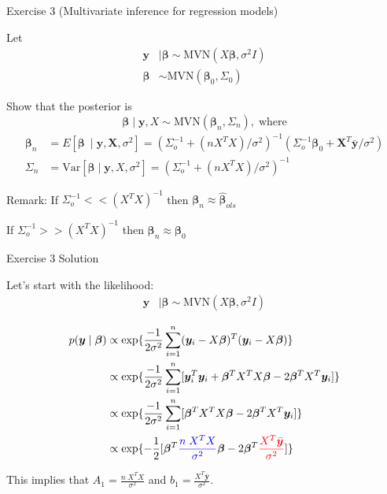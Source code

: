 \documentclass[
  ignorenonframetext,
]{beamer}
\newcommand{\bbeta}{\bm{\beta}}
\newcommand{\bX}   {\bm{X}}
\begin{document}
\begin{frame}{Exercise 3 (Multivariate inference for regression models)}
\protect\hypertarget{exercise-3-multivariate-inference-for-regression-models}{}

Let \begin{align}
\bm{y} &\mid \bbeta \sim \text{MVN}(X \bbeta, \sigma^2 I)\\
\bbeta &\sim \text{MVN}(\bbeta_0, \Sigma_0)
\end{align}

Show that the posterior is
\[\bbeta \mid \bm{y}, X \sim \text{MVN}(\bbeta_n, \Sigma_n), \; \text{where}\]
\begin{align*}
\bbeta_n &= E[\bbeta\ \mid \bm{y}, \bX, \sigma^2] = (\Sigma_o^{-1} + (nX^TX)/\sigma^2)^{-1}
(\Sigma_o^{-1}\bbeta_0 + \bX^T\bm{\bar{y}}/\sigma^2) \\
\Sigma_n &= \text{Var}[\bbeta \mid \bm{y}, X, \sigma^2] = (\Sigma_o^{-1} + (nX^TX)/\sigma^2)^{-1}
\end{align*}

Remark: If \(\Sigma_o^{-1} << (X^TX)^{-1}\) then
\(\bbeta_n \approx \hat{\bbeta}_{ols}\)

If \(\Sigma_o^{-1} >> (X^TX)^{-1}\) then \(\bbeta_n \approx \bbeta_{0}\)

\end{frame}

\begin{frame}{Exercise 3 Solution}
\protect\hypertarget{exercise-3-solution}{}

Let's start with the likelihood: \begin{align}
\bm{y} &\mid \bbeta \sim \text{MVN}(X \bbeta, \sigma^2 I)
\end{align}

\begin{align}
p(\bm{y}  \mid  \bbeta) &\propto \exp\{\frac{-1}{2\sigma^2}
\sum_{i=1}^n
(\bm{y}_i - X\bbeta)^T(\bm{y}_i - X\bbeta)
\} \\
&\propto \exp\{\frac{-1}{2\sigma^2}
\sum_{i=1}^n
[
\bm{y}_i^T\bm{y}_i + \bbeta^TX^TX\bbeta - 2\bbeta^TX^T\bm{y}_i
]
\}\\
&\propto \exp\{\frac{-1}{2\sigma^2}
\sum_{i=1}^n
[
\bbeta^TX^TX\bbeta - 2\bbeta^TX^T\bm{y}_i
]
\}\\
&\propto \exp\{-\frac{1}{2}
[
\bbeta^T\textcolor{blue}{\frac{n\;X^TX}{\sigma^2}}\bbeta - 2\bbeta^T\textcolor{red}{\frac{X^T\bar{\bm{y}}}{\sigma^2}}
]
\}
\end{align}

This implies that \(A_1 = \frac{n\;X^TX}{\sigma^2}\) and
\(b_1 = \frac{X^T\bar{\bm{y}}}{\sigma^2}.\)

\end{frame}
\end{document}

